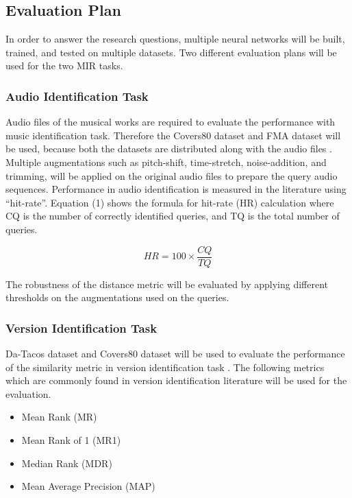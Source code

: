 \documentclass[../main.tex]{subfiles}
\begin{document}
\subsection{Evaluation Plan}
In order to answer the research questions, multiple neural networks will be built, trained, and tested on multiple datasets. Two different evaluation plans will be used for the two \gls{MIR} tasks.

\subsubsection{Audio Identification Task}
Audio files of the musical works are required to evaluate the performance with music identification task. Therefore the Covers80 dataset and FMA dataset will be used, because both the datasets are distributed along with the audio files \cite{Covers80CoverSong,defferrardFMADatasetMusic2017}. Multiple augmentations such as pitch-shift, time-stretch, noise-addition, and trimming, will be applied on the original audio files to prepare the query audio sequences. Performance in audio identification is measured in the literature using “hit-rate”. Equation (1) shows the formula for hit-rate (HR) calculation where CQ is the number of correctly identified queries, and TQ is the total number of queries.

\begin{equation}
    HR = 100 \times \frac{CQ}{TQ}
\end{equation}

\par
The robustness of the distance metric will be evaluated by applying different thresholds on the augmentations used on the queries.


\subsubsection{Version Identification Task}
Da-Tacos dataset and Covers80 dataset will be used to evaluate the performance of the similarity metric in version identification task \cite{yesilerDaTACOSDatasetCover2019,Covers80CoverSong}. The following metrics which are commonly found in version identification literature will be used for the evaluation.
\begin{itemize}
    \item Mean Rank (MR)
    \item Mean Rank of 1 (MR1)
    \item Median Rank (MDR)
    \item Mean Average Precision (MAP)
\end{itemize}
\end{document}
